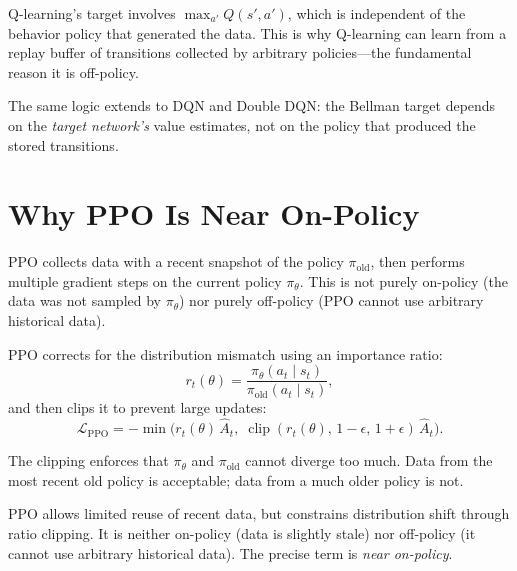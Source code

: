\begin{keyidea}
Q-learning's target involves $\max_{a'} Q(s', a')$, which is independent of the behavior policy that generated the data. This is why Q-learning can learn from a replay buffer of transitions collected by arbitrary policies---the fundamental reason it is off-policy.
\end{keyidea}

The same logic extends to DQN and Double DQN: the Bellman target depends on the \emph{target network's} value estimates, not on the policy that produced the stored transitions.

\section{Why PPO Is Near On-Policy}
\label{sec:ppo-near}

PPO collects data with a recent snapshot of the policy $\pi_{\text{old}}$, then performs multiple gradient steps on the current policy $\pi_\theta$. This is not purely on-policy (the data was not sampled by $\pi_\theta$) nor purely off-policy (PPO cannot use arbitrary historical data).

PPO corrects for the distribution mismatch using an importance ratio:
\begin{equation}
  r_t(\theta) = \frac{\pi_\theta(a_t \mid s_t)}{\pi_{\text{old}}(a_t \mid s_t)},
\end{equation}
and then clips it to prevent large updates:
\begin{equation}
  \mathcal{L}_{\text{PPO}} = -\min\!\bigl(
    r_t(\theta)\,\hat{A}_t,\;
    \operatorname{clip}(r_t(\theta),\, 1{-}\epsilon,\, 1{+}\epsilon)\,\hat{A}_t
  \bigr).
  \label{eq:ppo-clip}
\end{equation}

The clipping enforces that $\pi_\theta$ and $\pi_{\text{old}}$ cannot diverge too much. Data from the most recent old policy is acceptable; data from a much older policy is not.

\begin{keyidea}[Near On-Policy = Bounded Staleness]
PPO allows limited reuse of recent data, but constrains distribution shift through ratio clipping. It is neither on-policy (data is slightly stale) nor off-policy (it cannot use arbitrary historical data). The precise term is \emph{near on-policy}.
\end{keyidea}

